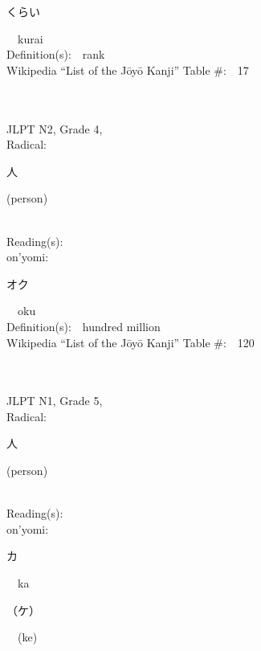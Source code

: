 \begin{multicols}{2}
{\hspace*{2em}}{\begin{CJK}{UTF8}{min} くらい \end{CJK}}\ \ kurai\ \ \\
Definition(s):\ \ rank \\
Wikipedia ``List of the J\=oy\=o Kanji'' Table \#:\ \ 17 \\
\ \ \\
{\fontsize{34pt}{40pt}  }\ \ \\  %
{JLPT N2, Grade 4, \\Radical:\ \ {\begin{CJK}{UTF8}{min} 人 \end{CJK}} (person) } \\
Reading(s):\ \ \\
{\hspace*{1em}}on'yomi:\ \ \\
{\hspace*{2em}}{\begin{CJK}{UTF8}{min} オク \end{CJK}}\ \ oku\ \ \\
Definition(s):\ \ hundred million \\
Wikipedia ``List of the J\=oy\=o Kanji'' Table \#:\ \ 120 \\
\ \ \\
{\fontsize{34pt}{40pt}  }\ \ \\  %
{JLPT N1, Grade 5, \\Radical:\ \ {\begin{CJK}{UTF8}{min} 人 \end{CJK}} (person) } \\
Reading(s):\ \ \\
{\hspace*{1em}}on'yomi:\ \ \\
{\hspace*{2em}}{\begin{CJK}{UTF8}{min} カ \end{CJK}}\ \ ka\ \ \\
{\hspace*{2em}}{\begin{CJK}{UTF8}{min} （ケ） \end{CJK}}\ \ (ke)\ \ \\

\end{multicols}

